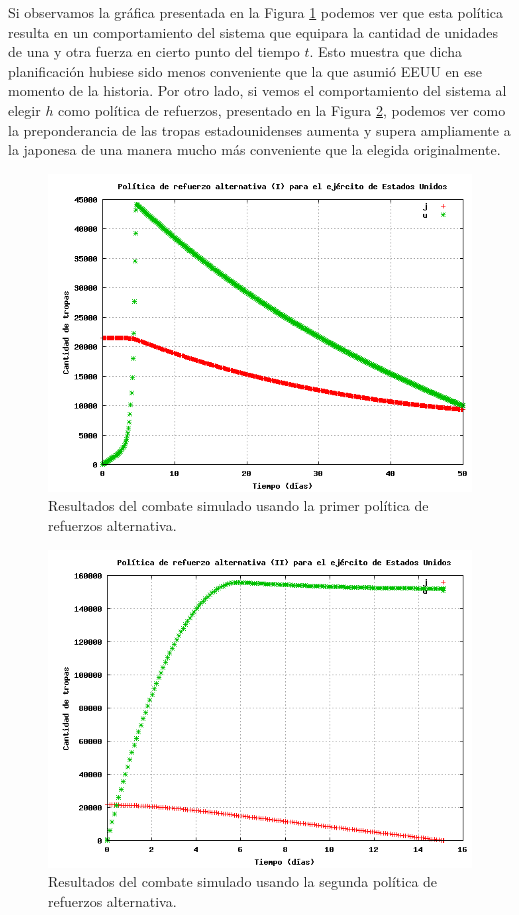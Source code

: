 \documentclass[a4paper,10pt]{article}
\begin{document}
Si observamos la gráfica presentada en la Figura \ref{fig:reinforce2} podemos ver que esta política resulta en un comportamiento del sistema
que equipara la cantidad de unidades de una y otra fuerza en cierto punto del tiempo $t$. Esto muestra que dicha planificación hubiese sido
menos conveniente que la que asumió EEUU en ese momento de la historia. Por otro lado, si vemos el comportamiento del sistema al elegir $h$
como política de refuerzos, presentado en la Figura \ref{fig:reinforce3}, podemos ver como la preponderancia de las tropas estadounidenses
aumenta y supera ampliamente a la japonesa de una manera mucho más conveniente que la elegida originalmente.

\begin{figure}[h]
\begin{center}
\includegraphics[width=12cm]{reinforce2.png}
\caption{\label{fig:reinforce2}Resultados del combate simulado usando la primer política de refuerzos alternativa.}
\end{center}
\end{figure}

\begin{figure}[h]
\begin{center}
\includegraphics[width=12cm]{reinforce3.png}
\caption{\label{fig:reinforce3}Resultados del combate simulado usando la segunda política de refuerzos alternativa.}
\end{center}
\end{figure}
\end{document}
